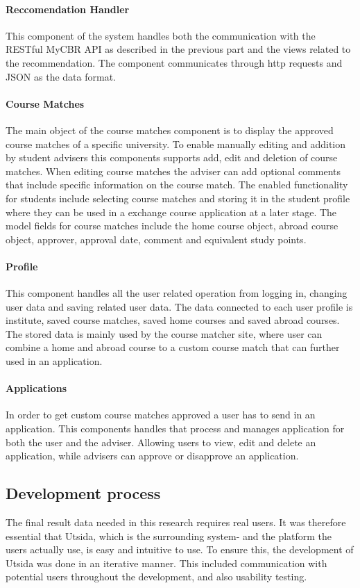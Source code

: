 \paragraph{Reccomendation Handler}
This component of the system handles both the communication with the RESTful MyCBR API as described in the previous part and the views related to the recommendation. The component communicates through http requests and JSON as the data format.

\paragraph{Course Matches}
The main object of the course matches component is to display the approved course matches of a specific university. To enable manually editing and addition by student advisers this components supports add, edit and deletion of course matches. When editing course matches the adviser can add optional comments that include specific information on the course match. The enabled functionality for students include selecting course matches and storing it in the student profile where they can be used in a exchange course application at a later stage. The model fields for course matches include the home course object, abroad course object, approver, approval date, comment and equivalent study points. 

\paragraph{Profile}
This component handles all the user related operation from logging in, changing user data and saving related user data. The data connected to each user profile is institute, saved course matches, saved home courses and saved abroad courses. The stored data is mainly used by the course matcher site, where user can combine a home and abroad course to a custom course match that can further used in an application. 

\paragraph{Applications}
In order to get custom course matches approved a user has to send in an application. This components handles that process and manages application for both the user and the adviser. Allowing users to view, edit and delete an application, while advisers can approve or disapprove an application. 

\subsection{Development process}
The final result data needed in this research requires real users. It was therefore essential that Utsida, which is the surrounding system- and the platform the users actually use, is easy and intuitive to use. To ensure this, the development of Utsida was done in an iterative manner. This included communication with potential users throughout the development, and also usability testing. 

